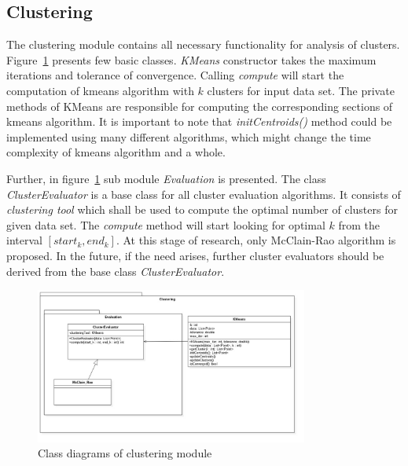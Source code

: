 \documentclass{article}
\begin{document}
\subsection{Clustering}

The clustering module contains all necessary functionality for analysis of clusters. Figure~\ref{fig:clustering_class} presents few basic classes. \textit{KMeans} constructor takes the maximum iterations and tolerance of convergence. Calling \textit{compute} will start the computation of kmeans algorithm with $k$ clusters for input data set. The private methods of KMeans are responsible for computing the corresponding sections of kmeans algorithm. It is important to note that \textit{initCentroids()} method could be implemented using many different algorithms, which might change the time complexity of kmeans algorithm and a whole.

Further, in figure~\ref{fig:clustering_class} sub module \textit{Evaluation} is presented. The class \textit{ClusterEvaluator} is a base class for all cluster evaluation algorithms. It consists of \textit{clustering tool} which shall be used to compute the optimal number of clusters for given data set. The \textit{compute} method will start looking for optimal $k$ from the interval $[start_k, end_k]$. At this stage of research, only McClain-Rao algorithm is proposed. In the future, if the need arises, further cluster evaluators should be derived from the base class \textit{ClusterEvaluator}.

%
%
\begin{figure}[H]
	\centering
	\includegraphics[width=0.8\textwidth]{images/clustering_class.jpg}
    \caption{Class diagrams of clustering module}
    \label{fig:clustering_class}
\end{figure}
\end{document}
